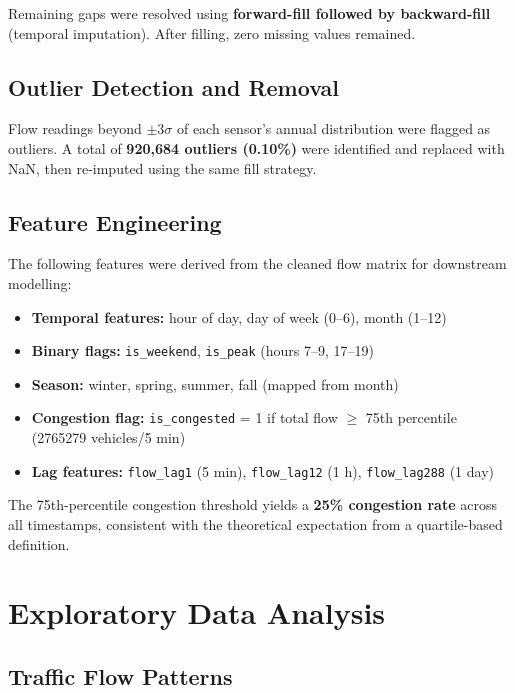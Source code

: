 \documentclass[12pt,a4paper]{article}
\begin{document}
Remaining gaps were resolved using \textbf{forward-fill followed by backward-fill} (temporal imputation). After filling, zero missing values remained.

\subsection{Outlier Detection and Removal}

Flow readings beyond $\pm 3\sigma$ of each sensor's annual distribution were flagged as outliers. A total of \textbf{920,684 outliers (0.10\%)} were identified and replaced with NaN, then re-imputed using the same fill strategy.

\subsection{Feature Engineering}

The following features were derived from the cleaned flow matrix for downstream modelling:

\begin{itemize}[itemsep=2pt]
    \item \textbf{Temporal features:} hour of day, day of week (0–6), month (1–12)
    \item \textbf{Binary flags:} \texttt{is\_weekend}, \texttt{is\_peak} (hours 7–9, 17–19)
    \item \textbf{Season:} winter, spring, summer, fall (mapped from month)
    \item \textbf{Congestion flag:} \texttt{is\_congested} = 1 if total flow $\geq$ 75th percentile (\num{2765279} vehicles/5 min)
    \item \textbf{Lag features:} \texttt{flow\_lag1} (5 min), \texttt{flow\_lag12} (1 h), \texttt{flow\_lag288} (1 day)
\end{itemize}

The 75th-percentile congestion threshold yields a \textbf{25\% congestion rate} across all timestamps, consistent with the theoretical expectation from a quartile-based definition.

\section{Exploratory Data Analysis}

\subsection{Traffic Flow Patterns}
\end{document}
